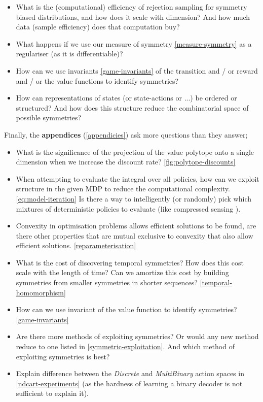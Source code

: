 \begin{itemize}
	\tightlist
	\item What is the (computational) efficiency of rejection sampling for symmetry biased distributions, and how does it scale with dimension? And how much data (sample efficiency) does that computation buy?
	\item What happens if we use our measure of symmetry \ref{measure-symmetry} as a regulariser (as it is differentiable)?
	\item How can we use invariants \ref{game-invariants} of the transition and / or reward and / or the value functions to identify symmetries?
	\item How can representations of states (or state-actions or ...) be ordered or structured? And how does this structure reduce the combinatorial space of possible symmetries?
\end{itemize}


Finally, the \textbf{appendices} (\ref{appendicies}) ask more questions than they answer;

\begin{itemize}
	\tightlist
	\item What is the significance of the projection of the value polytope onto a single dimension when we increase the discount rate? \ref{fig:polytope-discounts}
	\item When attempting to evaluate the integral  over all policies, how can we exploit structure in the given MDP to reduce the computational complexity. \ref{eq:model-iteration}
	Is there a way to intelligently (or randomly) pick which mixtures of deterministic policies to evaluate (like compressed sensing \cite{Candes2005}).
	\item Convexity in optimisation problems allows efficient solutions to be found, are there other properties that are mutual exclusive to convexity that also allow efficient solutions. \ref{reparameterisation}
	\item What is the cost of discovering temporal symmetries? How does this cost scale with the length of time? Can we amortize this cost by building symmetries from smaller symmetries in shorter sequences? \ref{temporal-homomorphism}
	\item How can we use invariant of the value function to identify symmetries? \ref{game-invariants}
	\item Are there more methods of exploiting symmetries? Or would any new method reduce to one listed in \ref{symmetric-exploitation}. And which method of exploiting symmetries is best?
	\item Explain difference between the \textit{Discrete} and \textit{MultiBinary} action spaces in \ref{ndcart-experiments} (as the hardness of learning a binary decoder is not sufficient to explain it).
\end{itemize}

